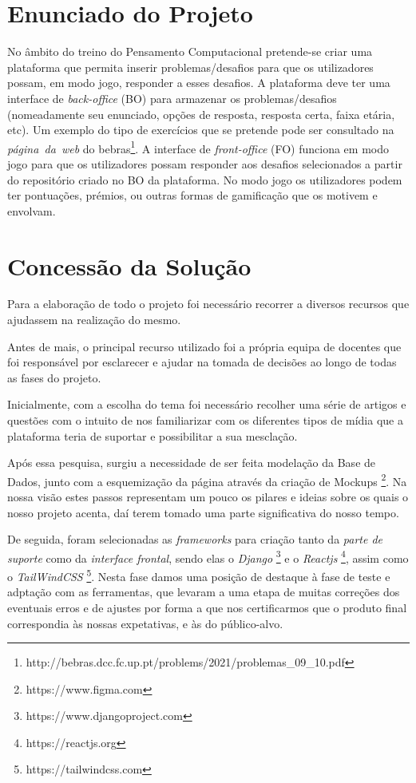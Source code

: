 \documentclass[11pt,a4paper]{report}
\begin{document}
\chapter{Enunciado do Projeto}

No âmbito do treino do Pensamento Computacional pretende-se criar uma plataforma que permita inserir problemas/desafios para que os utilizadores possam, em modo jogo, responder a esses desafios. A plataforma deve ter
uma interface de \emph{back-office} (BO) para armazenar os problemas/desafios (nomeadamente seu enunciado, opções de
resposta, resposta certa, faixa etária, etc). Um exemplo do tipo de exercícios que se pretende pode ser consultado na \emph{página\ da\ web} do bebras\footnote{http://bebras.dcc.fc.up.pt/problems/2021/problemas\_09\_10.pdf}.
A interface de \emph{front-office} (FO) funciona em modo jogo para que os utilizadores possam responder aos desafios
selecionados a partir do repositório criado no BO da plataforma. No modo jogo os utilizadores podem ter pontuações,
prémios, ou outras formas de gamificação que os motivem e envolvam.

\chapter{Concessão da Solução}

Para a elaboração de todo o projeto foi necessário recorrer a diversos recursos que ajudassem na realização do mesmo.

Antes de mais, o principal recurso utilizado foi a própria equipa de docentes que foi responsável por esclarecer e ajudar na tomada de decisões ao longo de todas as fases do projeto.

Inicialmente, com a escolha do tema foi necessário recolher uma série de artigos e questões com o intuito de nos familiarizar com os diferentes tipos de mídia que a plataforma teria de suportar e possibilitar a sua mesclação. 

Após essa pesquisa, surgiu a necessidade de ser feita modelação da Base de Dados, junto com a esquemização da página através da criação de Mockups \footnote{https://www.figma.com}. Na nossa visão estes passos representam um pouco os pilares e ideias sobre os quais o nosso projeto acenta, daí terem tomado uma parte significativa do nosso tempo.

De seguida, foram selecionadas as \emph{frameworks} para criação tanto da \emph{parte de suporte} como da \emph{interface frontal}, sendo elas o \emph{Django} \footnote{https://www.djangoproject.com} e o \emph{Reactjs} \footnote{https://reactjs.org}, assim como o \emph{TailWindCSS} \footnote{https://tailwindcss.com}. Nesta fase damos uma posição de destaque à fase de teste e adptação com as ferramentas, que levaram a uma etapa de muitas correções dos eventuais erros e de ajustes por forma a que nos certificarmos que o produto final correspondia às nossas expetativas, e às do público-alvo.
\end{document}
